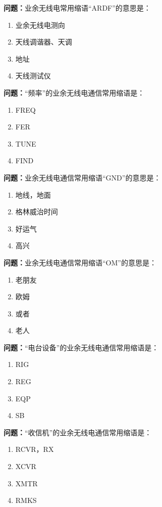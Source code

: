 \documentclass{ctexbook}%
\begin{document}
\textbf{问题：}业余无线电常用缩语“ARDF”的意思是：
\begin{enumerate}[label=\Alph*), leftmargin=3em]
\item 业余无线电测向
\item 天线调谐器、天调
\item 地址
\item 天线测试仪
\end{enumerate}

\textbf{问题：}“频率”的业余无线电通信常用缩语是：
\begin{enumerate}[label=\Alph*), leftmargin=3em]
\item FREQ
\item FER
\item TUNE
\item FIND
\end{enumerate}

\textbf{问题：}业余无线电通信常用缩语“GND”的意思是：
\begin{enumerate}[label=\Alph*), leftmargin=3em]
\item 地线，地面
\item 格林威治时间
\item 好运气
\item 高兴
\end{enumerate}

\textbf{问题：}业余无线电通信常用缩语“OM”的意思是：
\begin{enumerate}[label=\Alph*), leftmargin=3em]
\item 老朋友
\item 欧姆
\item 或者
\item 老人
\end{enumerate}

\textbf{问题：}“电台设备”的业余无线电通信常用缩语是：
\begin{enumerate}[label=\Alph*), leftmargin=3em]
\item RIG
\item REG
\item EQP
\item SB
\end{enumerate}

\textbf{问题：}“收信机”的业余无线电通信常用缩语是：
\begin{enumerate}[label=\Alph*), leftmargin=3em]
\item RCVR，RX
\item XCVR
\item XMTR
\item RMKS
\end{enumerate}
\end{document}
